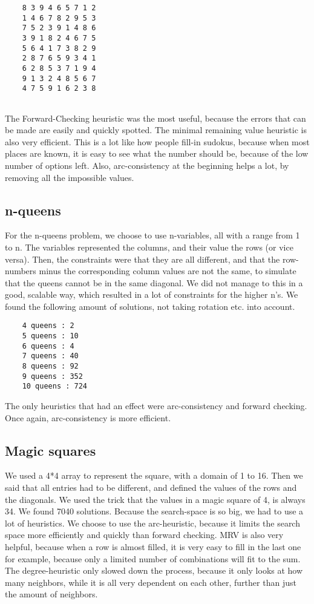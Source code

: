 \documentclass{article}
\begin{document}
	\begin{lstlisting}
	8 3 9 4 6 5 7 1 2 
	1 4 6 7 8 2 9 5 3 
	7 5 2 3 9 1 4 8 6 
	3 9 1 8 2 4 6 7 5 
	5 6 4 1 7 3 8 2 9 
	2 8 7 6 5 9 3 4 1 
	6 2 8 5 3 7 1 9 4 
	9 1 3 2 4 8 5 6 7 
	4 7 5 9 1 6 2 3 8 
	
	\end{lstlisting}
	
	The Forward-Checking heuristic was the most useful, because the errors that can be made are easily and quickly spotted. The minimal remaining value heuristic is also very efficient. This is a lot like how people fill-in sudokus, because when most places are known, it is easy to see what the number should be, because of the low number of options left. Also, arc-consistency at the beginning helps a lot, by removing all the impossible values.
	
	\subsection*{n-queens}
	
	For the n-queens problem, we choose to use n-variables, all with a range from 1 to n. The variables represented the columns, and their value the rows (or vice versa). Then, the constraints were that they are all different, and that the row-numbers minus the corresponding column values are not the same, to simulate that the queens cannot be in the same diagonal. We did not manage to this in a good, scalable way, which resulted in a lot of constraints for the higher n's. 
	We found the following amount of solutions, not taking rotation etc. into account.
	\begin{lstlisting}
	4 queens : 2
	5 queens : 10
	6 queens : 4
	7 queens : 40
	8 queens : 92
	9 queens : 352
	10 queens : 724	
	\end{lstlisting}
	
	The only heuristics that had an effect were arc-consistency and forward checking. Once again, arc-consistency is more efficient. 
	
	\subsection*{Magic squares}
	
	We used a 4*4 array to represent the square, with a domain of 1 to 16. Then we said that all entries had to be different, and defined the values of the rows and the diagonals. We used the trick that the values in a magic square of 4, is always 34. We found 7040 solutions. Because the search-space is so big, we had to use a lot of heuristics. We choose to use the arc-heuristic, because it limits the search space more efficiently and quickly than forward checking. MRV is also very helpful, because when a row is almost filled, it is very easy to fill in the last one for example, because only a limited number of combinations will fit to the sum. The degree-heuristic only slowed down the process, because it only looks at how many neighbors, while it is all very dependent on each other, further than just the amount of neighbors.
	
\end{document}
